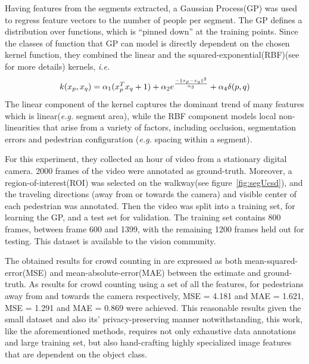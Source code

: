 Having features from the segments extracted, a Gaussian Process(GP)\cite{williams2006gaussian} was used to regress feature vectors to the number of people per segment. The GP defines a distribution over functions, which is “pinned down” at the training points\cite{chan2008privacy}. Since the classes of function that GP can model is directly dependent on the chosen kernel function, they combined the linear and the squared-exponential(RBF)(see \cite{chang2010training, vert2004primer, shashua2009introduction} for more details) kernels, \textit{i.e.}
\begin{equation}
\centering k(x_p, x_q) = \alpha_1(x_p^{T}x_q+1) + \alpha_2e^{\frac{-\|x_p-x_q\|^2}{\alpha_3}} + \alpha_4\delta(p,q)     
\end{equation}
The linear component of the kernel captures the dominant trend of many features which is linear(\textit{e.g.} segment area), while the RBF component models local non-linearities that arise from a variety of factors, including occlusion, segmentation errors and pedestrian configuration (\textit{e.g.} spacing within a segment)\cite{chan2008privacy}. 
  
For this experiment, they collected an hour of video from a stationary digital camera. 2000 frames of the video were annotated as ground-truth. Moreover, a region-of-interest(ROI) was selected on the walkway(see figure~\ref{fig:segUcsd}), and the traveling directions (away from or towards the camera) and visible center of each pedestrian was annotated. Then the video was split into a training set, for learning the GP, and a test set for validation. The training set contains 800 frames, between frame 600 and 1399, with the remaining 1200 frames held out for testing. This dataset is available to the vision community\cite{chan2008privacy}.

The obtained results for crowd counting in \cite{chan2008privacy} are expressed as both mean-squared-error(MSE) and mean-absolute-error(MAE) between the estimate and ground-truth. As results for crowd counting using a set of all the features, for pedestrians away from and towards the camera respectively, MSE = 4.181 and MAE = 1.621, MSE = 1.291 and MAE = 0.869 were achieved. This reasonable results given the small dataset and also its' privacy-preserving manner notwithstanding, this work, like the aforementioned methods, requires not only exhaustive data annotations and large training set, but also hand-crafting highly specialized image features that are dependent on the object class. 


